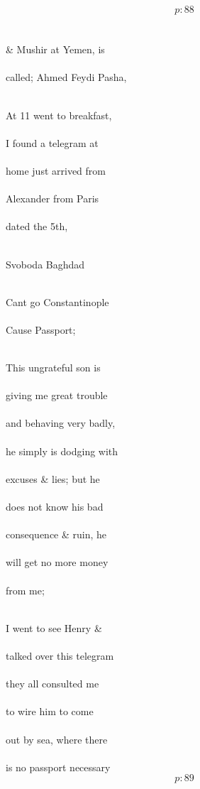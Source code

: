 \documentclass{report}
\begin{document}
{  \[p: 88 \]
\ \\\ \\\& Mushir at Yemen, is\ \\\ \\called; Ahmed Feydi Pasha,\ \\\ \\}

	\par{
 	At 11 went to breakfast,\ \\\ \\I found a telegram at\ \\\ \\home just arrived from\ \\\ \\Alexander from Paris\ \\\ \\dated the 5th,\ \\\ \\
	}

	\par{
 	Svoboda Baghdad\ \\\ \\
	}

	\par{
 	Cant go Constantinople\ \\\ \\Cause Passport;\ \\\ \\
	}

	\par{
 	This ungrateful son is\ \\\ \\giving me great trouble\ \\\ \\and behaving very badly,\ \\\ \\he simply is dodging with\ \\\ \\excuses \& lies; but he\ \\\ \\does not know his bad\ \\\ \\consequence \& ruin, he\ \\\ \\will get no more money\ \\\ \\from me;\ \\\ \\
	}

	\par{
 	I went to see Henry \&\ \\\ \\talked over this telegram\ \\\ \\they all consulted me\ \\\ \\to wire him to come\ \\\ \\out by sea, where there\ \\\ \\is no passport necessary\ \\
  \[p: 89 \]

	}
\end{document}
